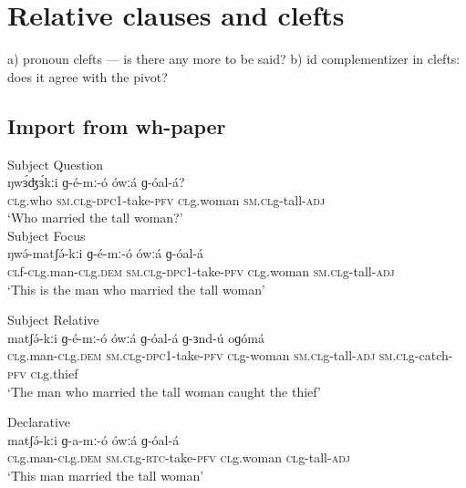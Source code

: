 \chapter{Relative clauses and clefts}\label{chapter:relative}




a) pronoun clefts --- is there any more to be said?
b) id complementizer in clefts: does it agree with the pivot?


\section{Import from wh-paper}

\ea
\ea	Subject Question\\
\gll 	ŋwɜ́ʤɜ́kːi	ɡ-é-mː-ó	ówːá	ɡ-óal-á?\\
		\textsc{cl}g.who	\textsc{sm.cl}g-\textsc{dpc1}-take-\textsc{pfv}	\textsc{cl}g.woman	\textsc{sm.cl}g-tall-\textsc{adj}\\
\trans	‘Who married the tall woman?’\\
\ex	Subject Focus\\
\gll	ŋwə́-matʃə́-kːi	ɡ-é-mː-ó	ówːá	ɡ-óal-á  \\
	\textsc{cl}f-\textsc{cl}g.man-\textsc{cl}g.\textsc{dem}	\textsc{sm.cl}g-\textsc{dpc1}-take-\textsc{pfv}	\textsc{cl}g.woman	\textsc{sm.cl}g-tall-\textsc{adj}\\    
\trans		‘This is the man who married the tall woman’\\
\z
\z

\ea	 	Subject Relative\\
\gll	matʃə́-kːi	ɡ-é-mː-ó	ówːá	ɡ-óal-á  	ɡ-ɜnd-ú	oɡómá\\       
	\textsc{cl}g.man-\textsc{cl}g.\textsc{dem}	\textsc{sm.cl}g-\textsc{dpc1}-take-\textsc{pfv}	\textsc{cl}g-woman	\textsc{\textsc{sm.cl}}g-tall-\textsc{adj}    
	\textsc{sm.cl}g-catch-\textsc{pfv}	\textsc{cl}g.thief\\
\trans	‘The man who married the tall woman caught the thief’\\
\z

\ea	Declarative\\
\gll	matʃə́-kːi	ɡ-a-mː-ó	ówːá	ɡ-óal-á  \\
	\textsc{cl}g.man-\textsc{cl}g.\textsc{dem}	\textsc{sm.cl}g-\textsc{rtc}-take-\textsc{pfv}	\textsc{cl}g.woman	\textsc{cl}g-tall-\textsc{adj}\\
\trans	‘This man married the tall woman’\\
\z


